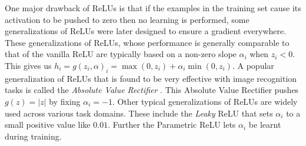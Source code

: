 \documentclass[14pt]{extarticle}
\numberwithin{equation}{section}
\begin{document}
		One major drawback of ReLUs is that if the examples in the training set cause its activation to be pushed to zero then no learning is performed, some generalizations of ReLUs were later designed to ensure a gradient everywhere. These generalizations of ReLUs, whose performance is generally comparable to that of the vanilla ReLU are typically based on a non-zero slope $\alpha_i$ when $z_i < 0$. This gives us  $h_i = g(z_i,\alpha)_i = \max(0,z_i) + \alpha_i \min(0,z_i)$. A popular generalization of ReLUs that is found to be very effective with image recognition tasks is called the \textit{Absolute Value Rectifier} \cite{jarrett2009best}. This Absolute Value Rectifier pushes $g(z) = |z| $ by fixing $\alpha_i = -1$. Other typical generalizations of ReLUs are widely used across various task domains. These include the \textit{Leaky} ReLU that sets $\alpha_i$ to a small positive value like $0.01$\cite{maas2013rectifier}. Further the Parametric ReLU lets $\alpha_i$ be learnt during training\cite{he2015delving}.
\end{document}
